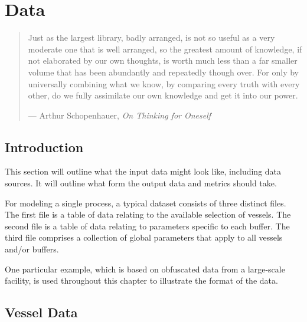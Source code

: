%
%
%
%

\chapter{Data}\label{C.data}

\begin{quote}
Just as the largest library, badly arranged, is not so useful as a very
moderate one that is well arranged, so the greatest amount of knowledge, if not
elaborated by our own thoughts, is worth much less than a far smaller volume
that has been abundantly and repeatedly though over.  For only by universally
combining what we know, by comparing every truth with every other, do we fully
assimilate our own knowledge and get it into our power.

\hspace{2cm}--- Arthur Schopenhauer, \emph{On Thinking for Oneself}
\end{quote}

\section{Introduction}\label{S.intro3}

This section will outline what the input data might look like, including data
sources.
It will outline what form the output data and metrics should take.

For modeling a single process, a typical dataset consists of three distinct
files.
The first file is a table of data relating to the available selection of
vessels.
The second file is a table of data relating to parameters specific
to each buffer.
The third file comprises a collection of global parameters
that apply to all vessels and/or buffers.

One particular example, which is based on obfuscated data from a large-scale
facility, is used throughout this chapter to illustrate the format of the data.

\section{Vessel Data}\label{S.vesseldata}

